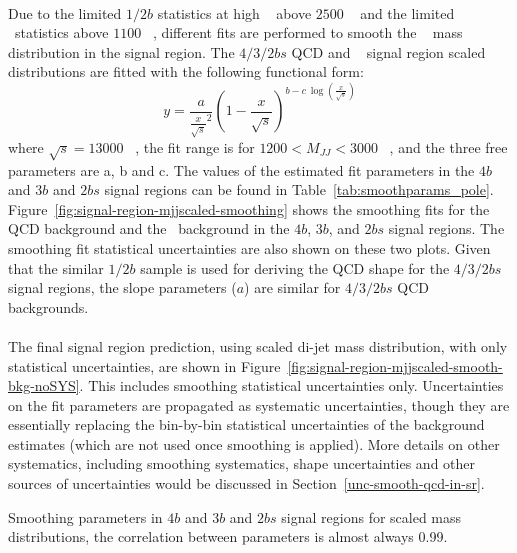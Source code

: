 \paragraph{} 
Due to the limited $1/2b$ statistics at high \mtwoJ~ above $2500$ \GeV~ and the limited \ttbar\ statistics above $1100$ \GeV~, different fits are performed to smooth the \mtwoJ~ mass distribution in the signal region. 
The $4/3/2bs$ QCD and \ttbar~ signal region scaled \mtwoJ~ distributions are fitted with the following functional form:
\begin{equation}
\label{eq:boosted_dijet}
y = \frac{a}{\frac{x}{\sqrt{s}}^2} (1-\frac{x}{\sqrt{s}})^{b - c\ \log(\frac{x}{\sqrt{s}})}
\end{equation}
where $\sqrt{s} = 13000$ \GeV~, the fit range is for $1200 < M_{JJ} < 3000$ \GeV~, and the three free parameters are a, b and c.
The values of the estimated fit parameters in the $4b$ and $3b$ and $2bs$ signal regions can be found in Table~\ref{tab:smoothparams_pole}.
Figure~\ref{fig:signal-region-mjjscaled-smoothing} shows the smoothing fits for the QCD background and the \ttbar\ background in the $4b$, $3b$, and $2bs$ signal regions.
The smoothing fit statistical uncertainties are also shown on these two plots. 
Given that the similar $1/2b$ sample is used for deriving the QCD shape for the $4/3/2bs$  signal regions, the slope parameters ($a$) are similar for  $4/3/2bs$ QCD backgrounds.

\paragraph{}
The final signal region prediction, using scaled di-jet mass distribution, with only statistical uncertainties, are shown in Figure~\ref{fig:signal-region-mjjscaled-smooth-bkg-noSYS}. 
This includes smoothing statistical uncertainties only. 
Uncertainties on the fit parameters are propagated as systematic uncertainties, though they are essentially replacing the bin-by-bin statistical uncertainties of the background estimates (which are not used once smoothing is applied).
More details on other systematics, including smoothing systematics, shape uncertainties and other sources of uncertainties would be discussed in Section~\ref{unc-smooth-qcd-in-sr}.

\begin{table}[htbp!]
\begin{center}
\caption{Smoothing parameters in $4b$ and $3b$ and $2bs$ signal regions for scaled mass distributions, the correlation between parameters is almost always 0.99.}

\label{tab:smoothparams_pole}
\end{center}
\end{table}

